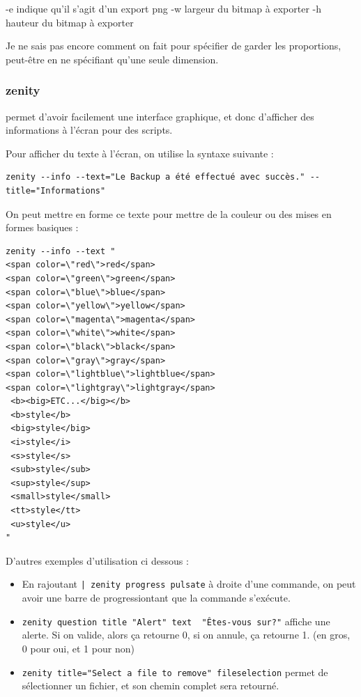 \documentclass[a4paper,twoside]{article}
\begin{document}
-e indique qu'il s'agit d'un export png
-w largeur du bitmap à exporter
-h hauteur du bitmap à exporter

\begin{remarque}
Je ne sais pas encore comment on fait pour spécifier de garder les proportions, peut-être en ne spécifiant qu'une seule dimension.
\end{remarque}

\subsubsection{zenity}\label{sec:zenity}
 permet d'avoir facilement une interface graphique, et donc d'afficher des informations à l'écran pour des scripts.

Pour afficher du texte à l'écran, on utilise la syntaxe suivante :

\begin{verbatim}
zenity --info --text="Le Backup a été effectué avec succès." --title="Informations"
\end{verbatim}

On peut mettre en forme ce texte pour mettre de la couleur ou des mises en formes basiques :
\begin{verbatim}
zenity --info --text "
<span color=\"red\">red</span>
<span color=\"green\">green</span>
<span color=\"blue\">blue</span>
<span color=\"yellow\">yellow</span>
<span color=\"magenta\">magenta</span>
<span color=\"white\">white</span>
<span color=\"black\">black</span>
<span color=\"gray\">gray</span>
<span color=\"lightblue\">lightblue</span>
<span color=\"lightgray\">lightgray</span>
 <b><big>ETC...</big></b>
 <b>style</b>
 <big>style</big>
 <i>style</i>
 <s>style</s>
 <sub>style</sub>
 <sup>style</sup>
 <small>style</small>
 <tt>style</tt>
 <u>style</u>
"
\end{verbatim}

D'autres exemples d'utilisation ci dessous :
\begin{itemize}
\item En rajoutant \verb#| zenity progress pulsate# à droite d'une commande, on peut avoir une barre de \og progression\fg tant que la commande s'exécute.
\item \verb|zenity question title "Alert" text  "Êtes-vous sur?"| affiche une alerte. Si on valide, alors ça retourne 0, si on annule, ça retourne 1. (en gros, 0 pour oui, et 1 pour non)
\item \verb|zenity title="Select a file to remove" fileselection| permet de sélectionner un fichier, et son chemin complet sera retourné.
\end{itemize}
\end{document}
